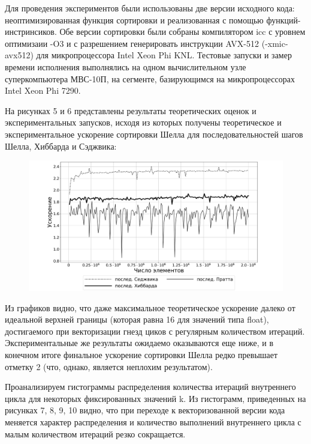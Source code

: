 Для проведения экспериментов были использованы две версии исходного кода: неоптимизированная функция сортировки и реализованная с помощью функций-инстринсиков.
Обе версии сортировки были собраны компилятором icc с уровнем оптимизаии -O3 и с разрешением генерировать инструкции AVX-512 (-xmic-avx512) для микропроцессора Intel Xeon Phi KNL.
Тестовые запуски и замер времени исполнения выполнялись на одном вычислительном узле суперкомпьютера МВС-10П, на сегменте, базирующимся на микропроцессорах Intel Xeon Phi 7290.

На рисунках 5 и 6 представлены результаты теоретических оценок и экспериментальных запусков, исходя из которых получены теоретическое и экспериментальное ускорение сортировки Шелла для последовательностей шагов Шелла, Хиббарда и Сэджвика:

\begin{figure}[ht]
	\centering
		\includegraphics[width=1.0\textwidth]{./pics/text_4_vec_irreg/experimental_eff.pdf}
	\caption{}
	\label{fig:text_4_vec_irreg_experimental_eff}
\end{figure}

Из графиков видно, что даже максимальное теоретическое ускорение далеко от идеальной верхней границы (которая равна 16 для значений типа float), достигаемого при векторизации гнезд циков с регулярным количеством итераций.
Экспериментальные же результаты ожидаемо оказываются еще ниже, и в конечном итоге финальное ускорение сортировки Шелла редко превышает отметку 2 (что, однако, является неплохим результатом).

Проанализируем гистограммы распределения количества итераций внутреннего цикла для некоторых фиксированных значений k.
Из гистограмм, приведенных на рисунках 7, 8, 9, 10 видно, что при переходе к векторизованной версии кода меняется характер распределения и количество выполнений внутреннего цикла с малым количеством итераций резко сокращается.

